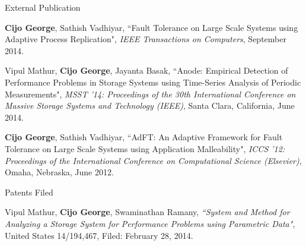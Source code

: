 \documentclass{resume} %
\begin{document}

\begin{rSection}{External Publication}

\begin{rPubPatContList}
\item {\bf Cijo George}, Sathish Vadhiyar, ``Fault Tolerance on Large Scale Systems using Adaptive Process Replication", {\em IEEE Transactions on Computers}, September 2014.
\item Vipul Mathur, {\bf Cijo George}, Jayanta Basak, ``Anode: Empirical Detection of Performance Problems in Storage Systems using Time-Series Analysis of Periodic Measurements", {\em MSST '14: Proceedings of the 30th International Conference on Massive Storage Systems and Technology (IEEE)}, Santa Clara, California, June 2014.
\item {\bf Cijo George}, Sathish Vadhiyar, ``AdFT: An Adaptive Framework for Fault Tolerance on Large Scale Systems using Application Malleability", {\em ICCS '12: Proceedings of the International Conference on Computational Science (Elsevier)}, Omaha, Nebraska, June 2012.
\end{rPubPatContList}
   
\end{rSection}


\begin{rSection}{Patents Filed}

\begin{rPubPatContList}
\item Vipul Mathur, {\bf Cijo George}, Swaminathan Ramany, {\em ``System and Method for Analyzing a Storage System for Performance Problems using Parametric Data"}, United States 14/194,467, Filed: February 28, 2014.
\end{rPubPatContList}
   
\end{rSection}

\end{document}
